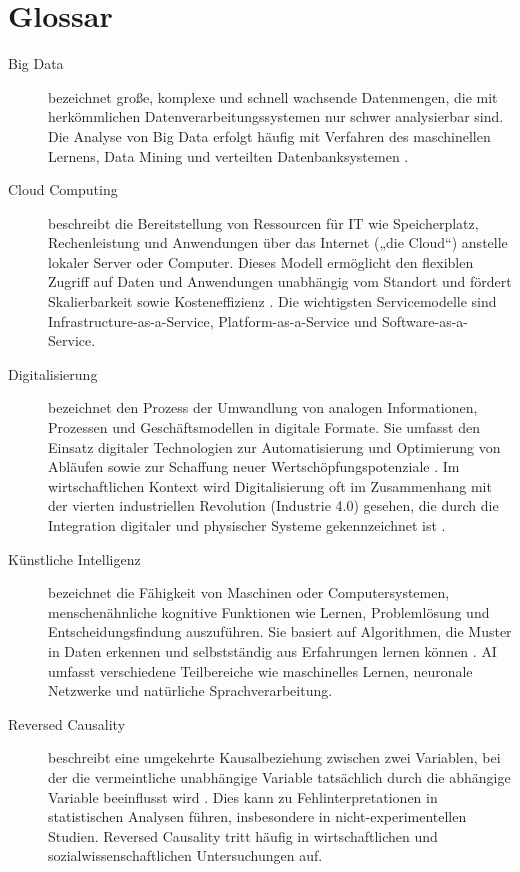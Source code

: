 \documentclass[a4paper, 12pt]{article}
\begin{document}
\section*{Glossar}
\begin{description}

  \item[Big Data] bezeichnet große, komplexe und schnell wachsende Datenmengen, die mit 
  herkömmlichen Datenverarbeitungssystemen nur schwer analysierbar sind. Die Analyse 
  von Big Data erfolgt häufig mit Verfahren des maschinellen Lernens, Data Mining und 
  verteilten Datenbanksystemen \parencite[vgl.][S. 138–139]{gandomi2014beyond}.

  \item[Cloud Computing] beschreibt die Bereitstellung von Ressourcen für \ac{IT} wie Speicherplatz, 
  Rechenleistung und Anwendungen über das Internet („die Cloud“) anstelle lokaler Server 
  oder Computer. Dieses Modell ermöglicht den flexiblen Zugriff auf Daten und Anwendungen 
  unabhängig vom Standort und fördert Skalierbarkeit sowie Kosteneffizienz 
  \parencite[vgl.][S. 50–52]{armbrust2010aview}. Die wichtigsten Servicemodelle sind 
  Infrastructure-as-a-Service, Platform-as-a-Service und 
  Software-as-a-Service.

  \item[Digitalisierung] bezeichnet den Prozess der Umwandlung von analogen Informationen, 
  Prozessen und Geschäftsmodellen in digitale Formate. Sie umfasst den Einsatz digitaler 
  Technologien zur Automatisierung und Optimierung von Abläufen sowie zur Schaffung neuer 
  Wertschöpfungspotenziale \parencite[vgl.][S. 6]{brennen2016theinternational}. Im 
  wirtschaftlichen Kontext wird Digitalisierung oft im Zusammenhang mit der vierten 
  industriellen Revolution (Industrie 4.0) gesehen, die durch die Integration digitaler 
  und physischer Systeme gekennzeichnet ist \parencite[vgl.][S. 114]{hofman2018arbeit}.

  \item[Künstliche Intelligenz] bezeichnet die Fähigkeit von Maschinen oder 
  Computersystemen, menschenähnliche kognitive Funktionen wie Lernen, Problemlösung und 
  Entscheidungsfindung auszuführen. Sie basiert auf Algorithmen, die Muster in Daten 
  erkennen und selbstständig aus Erfahrungen lernen können 
  \parencite[vgl.][S. 10–13]{russell2020artificial}. \ac{AI} umfasst verschiedene Teilbereiche 
  wie maschinelles Lernen, neuronale Netzwerke und natürliche Sprachverarbeitung.

  \item[Reversed Causality] beschreibt eine umgekehrte Kausalbeziehung zwischen zwei 
  Variablen, bei der die vermeintliche unabhängige Variable tatsächlich durch die 
  abhängige Variable beeinflusst wird \parencite[vgl.][S. 29-33]{pearl2009causality}. Dies kann zu 
  Fehlinterpretationen in statistischen Analysen führen, insbesondere in nicht-experimentellen 
  Studien. Reversed Causality tritt häufig in wirtschaftlichen und sozialwissenschaftlichen 
  Untersuchungen auf.

\end{description}
\end{document}
